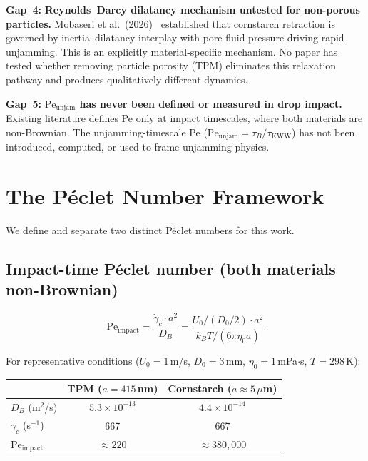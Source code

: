 \documentclass[11pt,letterpaper]{article}
\newcommand{\taukww}{\tau_{\mathrm{KWW}}}
\newcommand{\taub}{\tau_{B}}
\newcommand{\peunj}{\mathrm{Pe}_{\mathrm{unjam}}}
\newcommand{\peimp}{\mathrm{Pe}_{\mathrm{impact}}}
\newcommand{\gamcrit}{\dot{\gamma}_c}
\newcommand{\DB}{D_B}
\newcommand{\gap}[1]{\textbf{\color{gapborder}Gap~#1:}}
\begin{document}
\begin{gapbox}
\gap{4} \textbf{Reynolds--Darcy dilatancy mechanism untested for non-porous particles.}
Mobaseri et al.\ (2026)~\cite{Mobaseri2026} established that cornstarch
retraction is governed by inertia--dilatancy interplay with pore-fluid
pressure driving rapid unjamming. This is an explicitly material-specific
mechanism. No paper has tested whether removing particle porosity (TPM)
eliminates this relaxation pathway and produces qualitatively different dynamics.
\end{gapbox}

\begin{gapbox}
\gap{5} \textbf{$\peunj$ has never been defined or measured in drop impact.}
Existing literature defines Pe only at impact timescales, where both materials
are non-Brownian. The unjamming-timescale Pe ($\peunj = \taub / \taukww$)
has not been introduced, computed, or used to frame unjamming physics.
\end{gapbox}

\section{The Péclet Number Framework}

We define and separate two distinct Péclet numbers for this work.

\subsection{Impact-time Péclet number (both materials non-Brownian)}

\begin{equation}
  \peimp = \frac{\gamcrit \cdot a^2}{\DB}
  = \frac{U_0/(D_0/2)\cdot a^2}{k_B T/(6\pi\eta_0 a)}
  \label{eq:Pe_impact}
\end{equation}

\noindent For representative conditions ($U_0 = 1$\,m/s, $D_0 = 3$\,mm,
$\eta_0 = 1$\,mPa$\cdot$s, $T = 298$\,K):

\begin{center}
\begin{tabular}{lcc}
  \toprule
  & TPM ($a = 415$\,nm) & Cornstarch ($a \approx 5\,\mu$m) \\
  \midrule
  $\DB$ (m$^2$/s) & $5.3\times10^{-13}$ & $4.4\times10^{-14}$ \\
  $\gamcrit$ (s$^{-1}$) & 667 & 667 \\
  $\peimp$ & $\approx 220$ & $\approx 380{,}000$ \\
  \bottomrule
\end{tabular}
\end{center}
\end{document}
